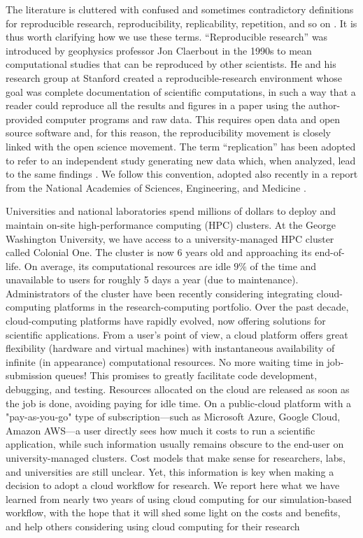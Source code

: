 \documentclass[10pt,journal,compsoc]{IEEEtran}
\begin{document}
The literature is cluttered with confused and sometimes contradictory definitions for reproducible research, reproducibility, replicability, repetition, and so on \cite{barba_2018}.
It is thus worth clarifying how we use these terms.
``Reproducible research'' was introduced by geophysics professor Jon Claerbout in the 1990s to mean computational studies that can be reproduced by other scientists. He and his research group at Stanford created a reproducible-research environment\cite{schwab_et_al_2000} whose goal was complete documentation of scientific computations, in such a way that a reader could reproduce all the results and figures in a paper using the author-provided computer programs and raw data.
This requires open data and open source software and, for this reason, the reproducibility movement is closely linked with the open science movement.
The term ``replication'' has been adopted to refer to an independent study generating new data which, when analyzed, lead to the same findings \cite{peng_2011}.
We follow this convention, adopted also recently in a report from the National Academies of Sciences, Engineering, and Medicine \cite{nasa_oss_2018}.

Universities and national laboratories spend millions of dollars to deploy and maintain on-site high-performance computing (HPC) clusters.
At the George Washington University, we have access to a university-managed HPC cluster called Colonial One.
The cluster is now $6$ years old and approaching its end-of-life.
On average, its computational resources are idle $9\%$ of the time and unavailable to users for roughly 5 days a year (due to maintenance).
Administrators of the cluster have been recently considering integrating cloud-computing platforms in the research-computing portfolio. 
Over the past decade, cloud-computing platforms have rapidly evolved, now offering solutions for scientific applications.
From a user's point of view, a cloud platform offers great flexibility (hardware and virtual machines) with instantaneous availability of infinite (in appearance) computational resources.
No more waiting time in job-submission queues!
This promises to greatly facilitate code development, debugging, and testing. Resources allocated on the cloud are released as soon as the job is done, avoiding paying for idle time.
On a public-cloud platform with a "pay-as-you-go" type of subscription---such as Microsoft Azure, Google Cloud, Amazon AWS---a user directly sees how much it costs to run a scientific application, while such information usually remains obscure to the end-user on university-managed clusters. 
Cost models that make sense for researchers, labs, and universities are still unclear. 
Yet, this information is key when making a decision to adopt a cloud workflow for research. 
We report here what we have learned from nearly two years of using cloud computing for our simulation-based workflow, with the hope that it will shed some light on the costs and benefits, and help others considering using cloud computing for their research
\end{document}
